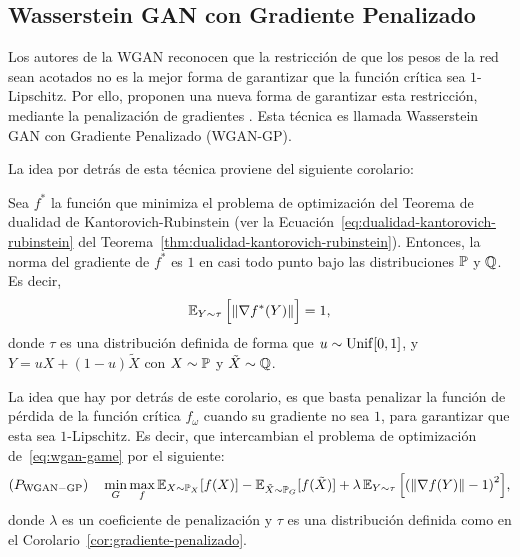 \subsection{Wasserstein GAN con Gradiente Penalizado}\label{ssec:}  %
Los autores de la WGAN reconocen que la restricción de que los pesos de la red sean acotados no es la mejor forma de garantizar que la función crítica sea $1$-Lipschitz. Por ello, proponen una nueva forma de garantizar esta restricción, mediante la penalización de gradientes \cite{gulrajani2017improved}. Esta técnica es llamada Wasserstein GAN con Gradiente Penalizado (WGAN-GP).

La idea por detrás de esta técnica proviene del siguiente corolario:

\begin{corollary}\label{cor:gradiente-penalizado}
    Sea $f^\ast$ la función que minimiza el problema de optimización del Teorema de dualidad de Kantorovich-Rubinstein (ver la Ecuación~\eqref{eq:dualidad-kantorovich-rubinstein} del Teorema~\ref{thm:dualidad-kantorovich-rubinstein}). Entonces, la norma del gradiente de $f^\ast$ es $1$ en casi todo punto bajo las distribuciones $\Prob$ y $\ProbQ$. Es decir,
    \begin{equation}
        \Exp_{Y\sim\tau} \qty\Big[ \norm{\nabla f^\ast(Y)} ] = 1,
    \end{equation}
    donde $\tau$ es una distribución definida de forma que $u\sim\mathrm{Unif}[0, 1]$, y $Y = uX + (1-u)\tilde X$ con $X\sim\Prob$ y $\tilde X\sim\ProbQ$.
\end{corollary}

La idea que hay por detrás de este corolario, es que basta penalizar la función de pérdida de la función crítica $f_\omega$ cuando su gradiente no sea $1$, para garantizar que esta sea $1$-Lipschitz. Es decir, que intercambian el problema de optimización de~\eqref{eq:wgan-game} por el siguiente:
\begin{equation}
    (P_{\mathrm{WGAN-GP}}) \quad \min_{G} \max_{f} \Exp_{X\sim \Prob_X} [f(X)] - \Exp_{\tilde X \sim \Prob_G} [f(\tilde X)] + \lambda \Exp_{Y\sim\tau} \qty\Big[ \qty(\norm{\nabla f(Y)} - 1)^2 ],
\end{equation}
donde $\lambda$ es un coeficiente de penalización y $\tau$ es una distribución definida como en el Corolario~\ref{cor:gradiente-penalizado}.

